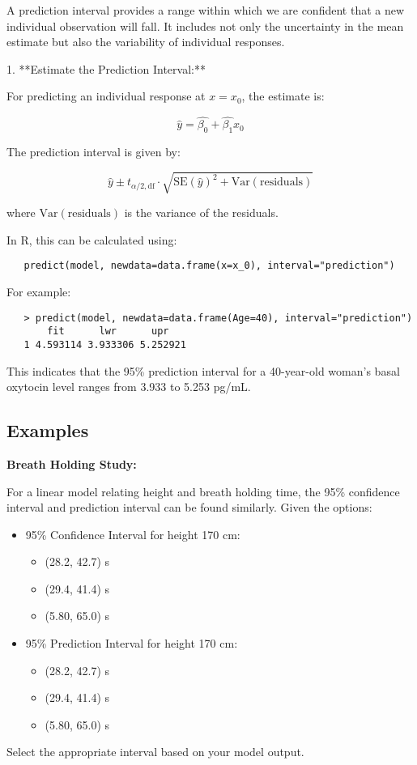 \documentclass{article}
\begin{document}
A prediction interval provides a range within which we are confident that a new individual observation will fall. It includes not only the uncertainty in the mean estimate but also the variability of individual responses.

1. **Estimate the Prediction Interval:**

   For predicting an individual response at \( x = x_0 \), the estimate is:

   \[
   \hat{y} = \hat{\beta_0} + \hat{\beta_1} x_0
   \]

   The prediction interval is given by:

   \[
   \hat{y} \pm t_{\alpha/2, \text{df}} \cdot \sqrt{\text{SE}(\hat{y})^2 + \text{Var}(\text{residuals})}
   \]

   where \( \text{Var}(\text{residuals}) \) is the variance of the residuals.

   In R, this can be calculated using:

   \begin{verbatim}
   predict(model, newdata=data.frame(x=x_0), interval="prediction")
   \end{verbatim}

   For example:

   \begin{verbatim}
   > predict(model, newdata=data.frame(Age=40), interval="prediction")
       fit      lwr      upr
   1 4.593114 3.933306 5.252921
   \end{verbatim}

   This indicates that the 95\% prediction interval for a 40-year-old woman’s basal oxytocin level ranges from 3.933 to 5.253 pg/mL.

\subsection{Examples}

\textbf{Breath Holding Study:}

For a linear model relating height and breath holding time, the 95\% confidence interval and prediction interval can be found similarly. Given the options:

\begin{itemize}
    \item 95\% Confidence Interval for height 170 cm: 
        \begin{itemize}
            \item (28.2, 42.7) s
            \item (29.4, 41.4) s
            \item (5.80, 65.0) s
        \end{itemize}
    \item 95\% Prediction Interval for height 170 cm: 
        \begin{itemize}
            \item (28.2, 42.7) s
            \item (29.4, 41.4) s
            \item (5.80, 65.0) s
        \end{itemize}
\end{itemize}

Select the appropriate interval based on your model output.
\end{document}
